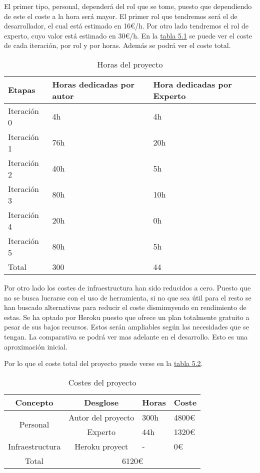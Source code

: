 El primer tipo, personal, dependerá del rol que se tome, puesto que dependiendo de este
el coste a la hora será mayor. El primer rol que tendremos será el de desarrollador, el
cual está estimado en 16€/h. Por otro lado tendremos el rol de experto, cuyo valor está estimado
en 30€/h. En la \hyperref[tab:Horas del proyecto]{tabla 5.1} se puede ver el coste de cada iteración, por rol y por horas.
Además se podrá ver el coste total.

\begin{table}[]
  \centering
  \caption{Horas del proyecto}
  \label{tab:Horas del proyecto}
  \begin{tabular}{|l|l|l|}
    \hline
    Etapas & Horas dedicadas por autor & Hora dedicadas por Experto \\ \hline
    Iteración 0 & 4h & 4h \\ \hline
    Iteración 1 & 76h & 20h \\ \hline
    Iteración 2 & 40h & 5h \\ \hline
    Iteración 3 & 80h & 10h \\ \hline
    Iteración 4 & 20h & 0h \\ \hline
    Iteración 5 & 80h & 5h \\ \hline
    Total & 300 & 44 \\ \hline
  \end{tabular}
\end{table}

Por otro lado los costes de infraestructura han sido reducidos a cero. Puesto que no se
busca lucrarse con el uso de herramienta, si no que sea útil para el resto se han buscado
alternativas para reducir el coste disminuyendo en rendimiento de estas. Se ha optado
por Heroku puesto que ofrece un plan totalmente gratuito a pesar de sus bajos recursos.
Estos serán ampliables según las necesidades que se tengan.  La comparativa se podrá ver mas adelante en el desarrollo. Esto es una aproximación inicial.

Por lo que el coste total del proyecto puede verse en la \hyperref[tab:Costes del proyecto]{tabla 5.2}.

\begin{table}[]
  \centering
  \caption{Costes del proyecto}
  \label{tab:Costes del proyecto}
  \begin{tabular}{|c|c|l|l|}
    \hline
    Concepto & Desglose & Horas & Coste \\ \hline
    \multirow{2}{*}{Personal} & Autor del proyecto & 300h & 4800€ \\ \cline{2-4}
    & Experto & 44h & 1320€ \\ \hline
    Infraestructura & Heroku proyect & - & 0€ \\ \hline
    Total & \multicolumn{3}{c|}{6120€} \\ \hline
  \end{tabular}
\end{table}
